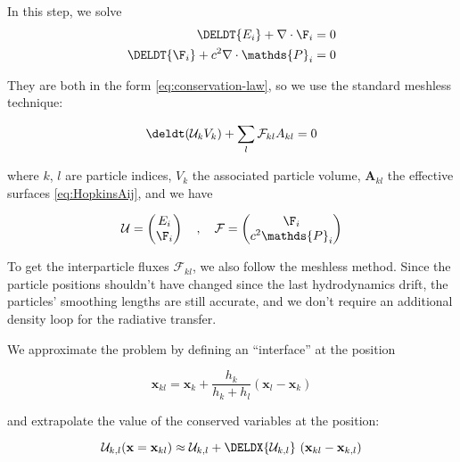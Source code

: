 In this step, we solve
\begin{align}
    \DELDT{E_i} + \nabla \cdot \F_i &= 0 \label{eq:homogenized-dEdt}\\
    \DELDT{\F_i} + c^2 \nabla \cdot \mathds{P}_i &= 0 \label{eq:homogenized-dFdt}
\end{align}

They are both in the form \ref{eq:conservation-law}, so we use the standard meshless technique:

\begin{align}
	\deldt(\mathcal{U}_k V_k) + \sum\limits_{l} \mathcal F_{kl} A_{kl} = 0 \label{eq:meshless}
\end{align}

where $k$, $l$ are particle indices, $V_k$ the associated particle volume,
$\mathbf{A}_{kl}$ the effective surfaces \ref{eq:HopkinsAij}, and we have

\begin{align}
	\mathcal{U} =
		\begin{pmatrix}
			E_i \\
			\F_i
		\end{pmatrix}
	\quad , \quad
	\mathcal{F} =
		\begin{pmatrix}
			\F_i \\
			c^2 \mathds{P}_i
		\end{pmatrix}
\end{align}



To get the interparticle fluxes $\mathcal{F}_{kl}$, we also follow the meshless method. Since the 
particle positions shouldn't have changed since the last hydrodynamics drift, the particles' 
smoothing lengths are still accurate, and we don't require an additional density loop for the 
radiative transfer.

We approximate the problem by defining an ``interface'' at the position

\begin{equation}
	\mathbf{x}_{kl} = \mathbf{x}_k + \frac{h_k}{h_k + h_l} ( \mathbf{x}_l - \mathbf{x}_k )
\end{equation}

and extrapolate the value of the conserved variables at the position:

\begin{equation}
	\mathcal{U}_{k, l}(\mathbf{x} =
        \mathbf{x}_{kl}) \approx \mathcal{U}_{k, l} + \DELDX{ \mathcal{U}_{k, l}}\ (\mathbf{x}_{kl} - \mathbf{x}_{k,l})
\end{equation}

